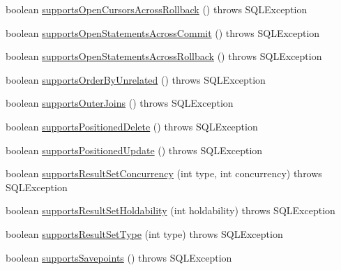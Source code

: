\begin{DoxyCompactItemize}
\item 
boolean \mbox{\hyperlink{classcom_1_1mysql_1_1cj_1_1jdbc_1_1_database_meta_data_af3a996ba4e3b048d32c31eb7c3b78d72}{supports\+Open\+Cursors\+Across\+Rollback}} ()  throws S\+Q\+L\+Exception 
\item 
boolean \mbox{\hyperlink{classcom_1_1mysql_1_1cj_1_1jdbc_1_1_database_meta_data_a1171f342070ba74e050ada26fb00a2e5}{supports\+Open\+Statements\+Across\+Commit}} ()  throws S\+Q\+L\+Exception 
\item 
boolean \mbox{\hyperlink{classcom_1_1mysql_1_1cj_1_1jdbc_1_1_database_meta_data_a73a0af0c988f3bf90b1ab8a57b64eda1}{supports\+Open\+Statements\+Across\+Rollback}} ()  throws S\+Q\+L\+Exception 
\item 
boolean \mbox{\hyperlink{classcom_1_1mysql_1_1cj_1_1jdbc_1_1_database_meta_data_a93f3c1c92f35d93a3a016d19b7ae19ef}{supports\+Order\+By\+Unrelated}} ()  throws S\+Q\+L\+Exception 
\item 
boolean \mbox{\hyperlink{classcom_1_1mysql_1_1cj_1_1jdbc_1_1_database_meta_data_a61be48103a75fa639d5a422acbb15b49}{supports\+Outer\+Joins}} ()  throws S\+Q\+L\+Exception 
\item 
boolean \mbox{\hyperlink{classcom_1_1mysql_1_1cj_1_1jdbc_1_1_database_meta_data_aceadcafefa2483ef40e48b1aeb2edd33}{supports\+Positioned\+Delete}} ()  throws S\+Q\+L\+Exception 
\item 
boolean \mbox{\hyperlink{classcom_1_1mysql_1_1cj_1_1jdbc_1_1_database_meta_data_afe01b3d8023ed83aa4c67f786d47f412}{supports\+Positioned\+Update}} ()  throws S\+Q\+L\+Exception 
\item 
boolean \mbox{\hyperlink{classcom_1_1mysql_1_1cj_1_1jdbc_1_1_database_meta_data_a642e1d8dc7574859b8cfc640e889ff58}{supports\+Result\+Set\+Concurrency}} (int type, int concurrency)  throws S\+Q\+L\+Exception 
\item 
boolean \mbox{\hyperlink{classcom_1_1mysql_1_1cj_1_1jdbc_1_1_database_meta_data_a97fe356d4a91c7e2f531253265a7f96b}{supports\+Result\+Set\+Holdability}} (int holdability)  throws S\+Q\+L\+Exception 
\item 
boolean \mbox{\hyperlink{classcom_1_1mysql_1_1cj_1_1jdbc_1_1_database_meta_data_a13385ceb5415ae88f636239293f88b8f}{supports\+Result\+Set\+Type}} (int type)  throws S\+Q\+L\+Exception 
\item 
boolean \mbox{\hyperlink{classcom_1_1mysql_1_1cj_1_1jdbc_1_1_database_meta_data_a56697e6cabb6dce61efbeaa285d028fe}{supports\+Savepoints}} ()  throws S\+Q\+L\+Exception 
\item 

\end{DoxyCompactItemize}
